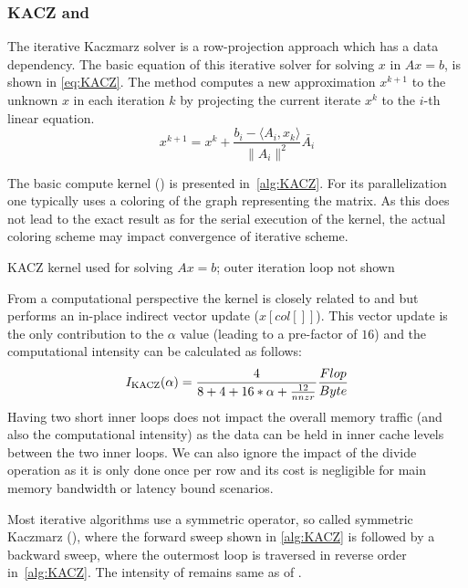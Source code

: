 \subsubsection{KACZ and \SYMMKACZ}
The iterative Kaczmarz solver is a row-projection approach which has a data dependency. The basic equation of this iterative solver for solving $x$ in $Ax = b$, is shown in \cref{eq:KACZ}. The method computes a new approximation $x^{k+1}$ to the unknown $x$ in each iteration $k$ by projecting  the current iterate $x^{k}$ to the $i$-th linear equation. 
\begin{equation}
	\label{eq:KACZ}
	x^{k+1} = x^{k} + \frac{b_i - \langle A_i, x_k \rangle}{\|A_i\|^2} \bar{A_i}
\end{equation}

The basic compute kernel (\KACZ) is  presented in~\cref{alg:KACZ}. For its parallelization one typically uses a \DTWO coloring of the graph representing the matrix. As this does not lead to the exact result as for the serial execution of the kernel, the actual coloring scheme may impact convergence of iterative scheme.

\begin{algorithm}[H]
	\caption{KACZ kernel used for solving $Ax=b$; outer iteration loop not shown} 
	\label{alg:KACZ}
	\begin{algorithmic}[1]
		\ENDFOR
		\ENDFOR
		\ENDFOR
	\end{algorithmic}
\end{algorithm}
From a computational perspective the kernel is closely related to \SpMV and \SymmSpmv but performs an in-place indirect vector update ($x[col[]]$). This vector update is the only contribution to the $\alpha$ value (leading to a pre-factor of $16$) and the computational intensity can be calculated as follows:
\begin{equation}
\label{eq:KACZ_intensity}
I_\mathrm{KACZ} (\alpha)=  \frac{4}{8+4+16*\alpha+\frac{12}{nnzr}} \frac{Flop}{Byte}\\
\end{equation}
Having two short inner loops does not impact the overall memory traffic (and also the computational intensity) as the data can be held in inner cache levels between the two inner loops. We can also ignore the impact of the divide operation as it is only done once per row and its cost is negligible for main memory bandwidth or latency bound scenarios.  

Most iterative algorithms use a symmetric operator, so called symmetric Kaczmarz (\SYMMKACZ), where the forward sweep shown in \cref{alg:KACZ} is followed by a backward sweep, where the outermost loop is traversed in reverse order   in~\cref{alg:KACZ}. The intensity of \SYMMKACZ remains same as of \KACZ. 

